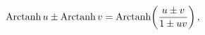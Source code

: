 \[\mathop{\mathrm{Arctanh}\/}\nolimits u\pm\mathop{\mathrm{Arctanh}\/}\nolimits v%
=\mathop{\mathrm{Arctanh}\/}\nolimits\!\left(\frac{u\pm v}{1\pm uv}\right),\]